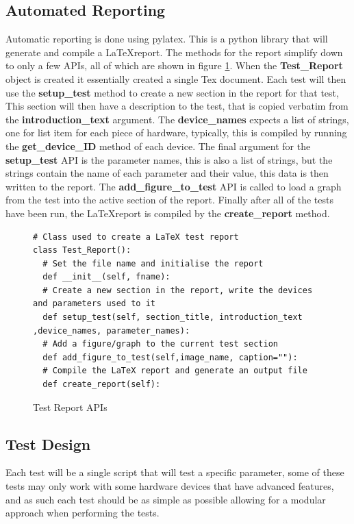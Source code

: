 \documentclass[a4paper, 11pt]{article}
\begin{document}
\subsection{Automated Reporting}
Automatic reporting is done using pylatex. This is a python library that will generate and compile a \LaTeX \space report. The methods for the report simplify down to only a few APIs, all of which are shown in figure \ref{fig:TestReportAPIs}. When the \textbf{Test\_Report} object is created it essentially created a single Tex document. Each test will then use the \textbf{setup\_test} method to create a new section in the report for that test, This section will then have a description to the test, that is copied verbatim from the \textbf{introduction\_text} argument. The \textbf{device\_names} expects a list of strings, one for list item for each piece of hardware, typically, this is compiled by running the \textbf{get\_device\_ID} method of each device. The final argument for the \textbf{setup\_test} API is the parameter names, this is also a list of strings, but the strings contain the name of each parameter and  their value, this data is then written to the report. The \textbf{add\_figure\_to\_test} API is called to load a graph from the test into the active section of the report. Finally after all of the tests have been run, the \LaTeX \space report is compiled by the \textbf{create\_report} method. 

\begin{figure}[H]
\begin{verbatim}
# Class used to create a LaTeX test report
class Test_Report():
  # Set the file name and initialise the report 
  def __init__(self, fname):
  # Create a new section in the report, write the devices and parameters used to it
  def setup_test(self, section_title, introduction_text ,device_names, parameter_names):
  # Add a figure/graph to the current test section
  def add_figure_to_test(self,image_name, caption=""):
  # Compile the LaTeX report and generate an output file
  def create_report(self):
\end{verbatim}
\caption{Test Report APIs}
\label{fig:TestReportAPIs}
\end{figure}

\subsection{Test Design}
Each test will be a single script that will test a specific parameter, some of these tests may only work with some hardware devices that have advanced features, and as such each test should be as simple as possible allowing for a modular approach when performing the tests. 
\end{document}
